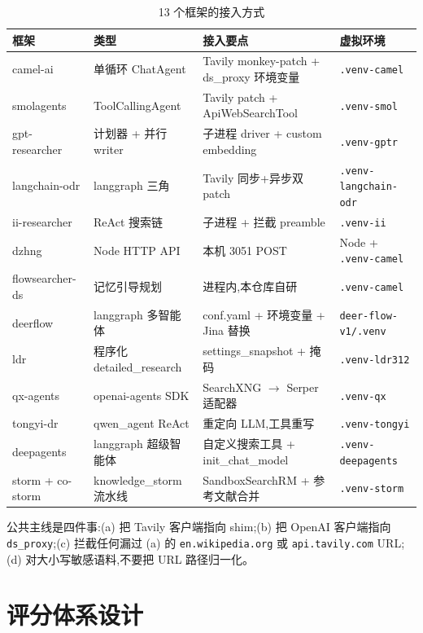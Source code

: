 \documentclass[UTF8,a4paper,12pt,oneside]{ctexart}
\begin{document}
\begin{table}[ht]
\centering
\small
\caption{13 个框架的接入方式}
\begin{tabular}{l l l l}
\toprule
框架 & 类型 & 接入要点 & 虚拟环境 \\
\midrule
camel-ai & 单循环 ChatAgent & Tavily monkey-patch + ds\_proxy 环境变量 & \texttt{.venv-camel} \\
smolagents & ToolCallingAgent & Tavily patch + ApiWebSearchTool & \texttt{.venv-smol} \\
gpt-researcher & 计划器 + 并行 writer & 子进程 driver + custom embedding & \texttt{.venv-gptr} \\
langchain-odr & langgraph 三角 & Tavily 同步+异步双 patch & \texttt{.venv-langchain-odr} \\
ii-researcher & ReAct 搜索链 & 子进程 + 拦截 preamble & \texttt{.venv-ii} \\
dzhng & Node HTTP API & 本机 3051 POST & Node + \texttt{.venv-camel} \\
flowsearcher-ds & 记忆引导规划 & 进程内,本仓库自研 & \texttt{.venv-camel} \\
deerflow & langgraph 多智能体 & conf.yaml + 环境变量 + Jina 替换 & \texttt{deer-flow-v1/.venv} \\
ldr & 程序化 detailed\_research & settings\_snapshot + 掩码 & \texttt{.venv-ldr312} \\
qx-agents & openai-agents SDK & SearchXNG \(\to\) Serper 适配器 & \texttt{.venv-qx} \\
tongyi-dr & qwen\_agent ReAct & 重定向 LLM,工具重写 & \texttt{.venv-tongyi} \\
deepagents & langgraph 超级智能体 & 自定义搜索工具 + init\_chat\_model & \texttt{.venv-deepagents} \\
storm + co-storm & knowledge\_storm 流水线 & SandboxSearchRM + 参考文献合并 & \texttt{.venv-storm} \\
\bottomrule
\end{tabular}
\end{table}

公共主线是四件事:(a) 把 Tavily 客户端指向 shim;(b) 把 OpenAI 客户端指向 \texttt{ds\_proxy};(c) 拦截任何漏过 (a) 的 \texttt{en.wikipedia.org} 或 \texttt{api.tavily.com} URL;(d) 对大小写敏感语料,不要把 URL 路径归一化。

\section{评分体系设计}
\end{document}
